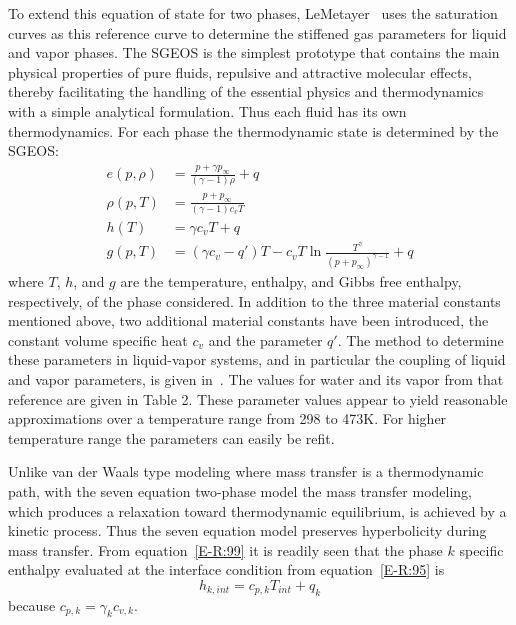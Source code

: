 To extend this equation of state for two phases,
LeMetayer~\cite{SGEOS} uses the saturation curves as this
reference curve to determine the stiffened gas parameters for liquid
and vapor phases.  The SGEOS is the simplest prototype that contains
the main physical properties of pure fluids, repulsive and attractive
molecular effects, thereby facilitating the handling of the essential
physics and thermodynamics with a simple analytical formulation.  Thus
each fluid has its own thermodynamics.  For each phase the
thermodynamic state is determined by the SGEOS:
\begin{align}
  \label{E-R:97}
  e(p,\rho) &= \frac{p+\gamma p_{\infty}}{(\gamma -1) \rho} + q
  \\
  \label{E-R:98}
  \rho (p,T) &= \frac{p+p_{\infty}}{(\gamma -1) c_v T}
  \\
  \label{E-R:99}
  h(T) &= \gamma  c_v T + q
  \\
  \label{E-R:100}
  g(p,T) &= \left(\gamma c_v - q'\right) T - c_v T \ln \frac{T^\gamma}{\left(p+p_{\infty}\right)^{\gamma-1}} + q
\end{align}
where $T$, $h$, and $g$ are the temperature, enthalpy,
and Gibbs free enthalpy, respectively, of the phase considered.  In
addition to the three material constants mentioned above, two
additional material constants have been introduced, the constant
volume specific heat $c_v$ and the parameter $q'$.  The method to
determine these parameters in liquid-vapor systems, and in particular
the coupling of liquid and vapor parameters, is given
in~\cite{SGEOS}.  The values for water and its vapor from that
reference are given in Table 2.  These parameter values appear to
yield reasonable approximations over a temperature range from 298 to
473K.  For higher temperature range the parameters can easily be
refit.

Unlike van der Waals type modeling where mass transfer is a
thermodynamic path, with the seven equation two-phase model the mass
transfer modeling, which produces a relaxation toward thermodynamic
equilibrium, is achieved by a kinetic process.  Thus the seven equation
model preserves hyperbolicity during mass transfer.
From equation~\eqref{E-R:99} it is readily seen that the phase
$k$ specific enthalpy evaluated at the interface condition from
equation~\eqref{E-R:95} is
\begin{equation}
  h_{k,  int} = c_{p, k}  T_{int} + q_k
\end{equation}
because $c_{p, k} = \gamma_k  c_{v, k}$.

